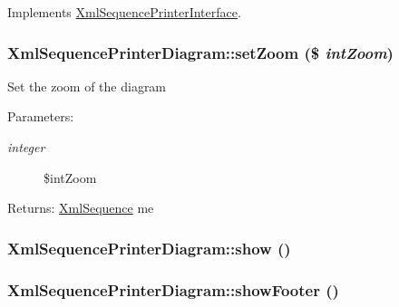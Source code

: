 Implements \hyperlink{interface_xml_sequence_printer_interface_68a8066e69c402d49dd0a16a22cfcb6b}{XmlSequencePrinterInterface}.\hypertarget{class_xml_sequence_printer_diagram_e80bb8be07efce8abf9af54488d3c616}{
\subsubsection[{setZoom}]{\setlength{\rightskip}{0pt plus 5cm}XmlSequencePrinterDiagram::setZoom (\$ {\em intZoom})}}
\label{class_xml_sequence_printer_diagram_e80bb8be07efce8abf9af54488d3c616}


Set the zoom of the diagram

\begin{Desc}
\item[Parameters:]
\begin{description}
\item[{\em integer}]\$intZoom \end{description}
\end{Desc}
\begin{Desc}
\item[Returns:]\hyperlink{class_xml_sequence}{XmlSequence} me \end{Desc}
\hypertarget{class_xml_sequence_printer_diagram_bf7cd1d36e6867cefed731112b9ed8e8}{
\subsubsection[{show}]{\setlength{\rightskip}{0pt plus 5cm}XmlSequencePrinterDiagram::show ()}}
\label{class_xml_sequence_printer_diagram_bf7cd1d36e6867cefed731112b9ed8e8}


\hypertarget{class_xml_sequence_printer_diagram_11f8dd9065dd384aeb6e498578cff669}{
\subsubsection[{showFooter}]{\setlength{\rightskip}{0pt plus 5cm}XmlSequencePrinterDiagram::showFooter ()}}
\label{class_xml_sequence_printer_diagram_11f8dd9065dd384aeb6e498578cff669}


